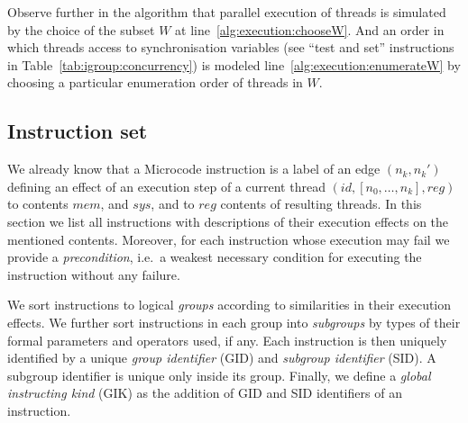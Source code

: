 \documentclass[10pt,twocolumn]{article}
\begin{document}
Observe further in the algorithm that parallel execution of threads is simulated
by the choice of the subset $ W $ at line~\ref{alg:execution:chooseW}. And an
order in which threads access to synchronisation variables (see ``test and set''
instructions in Table~\ref{tab:igroup:concurrency}) is modeled
line~\ref{alg:execution:enumerateW} by choosing a particular enumeration order
of threads in $ W $.


\subsection{Instruction set}
\label{sec:microcode:instructions}

We already know that a Microcode instruction is a label of an edge $ (n_k,n_k')
$ defining an effect of an execution step of a current thread $
(\textit{id},[n_0,\ldots,n_k],\mathit{reg} ) $ to contents $ \mathit{mem} $, and
$ \mathit{sys} $, and to $ \mathit{reg} $ contents of resulting threads. In this
section we list all instructions with descriptions of their execution effects on
the mentioned contents. Moreover, for each instruction whose execution may fail
we provide a \emph{precondition}, i.e.~a weakest necessary condition for
executing the instruction without any failure.

We sort instructions to logical \emph{groups} according to similarities in their
execution effects. We further sort instructions in each group into
\emph{subgroups} by types of their formal parameters and operators used, if any.
Each instruction is then uniquely identified by a unique \emph{group identifier}
(GID) and \emph{subgroup identifier} (SID). A subgroup identifier is unique only
inside its group. Finally, we define a \emph{global instructing kind} (GIK) as
the addition of GID and SID identifiers of an instruction.
\end{document}
